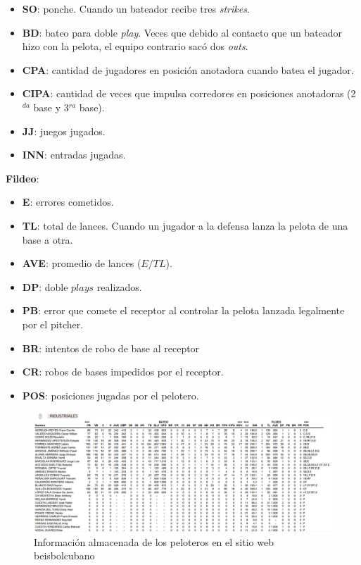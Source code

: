 \begin{itemize}
	\item \textbf{SO}: ponche. Cuando un bateador recibe tres \textit{strikes}.
	\item \textbf{BD}: bateo para doble \textit{play}. Veces que debido al contacto que un bateador hizo con la pelota, el equipo contrario sacó dos \textit{outs}.
	\item \textbf{CPA}: cantidad de jugadores en posición anotadora cuando batea el jugador.
	\item \textbf{CIPA}: cantidad de veces que impulsa corredores en posiciones anotadoras (2$^{da}$ base y 3$^{ra}$ base).
	\item \textbf{JJ}: juegos jugados.
	\item \textbf{INN}: entradas jugadas.
\end{itemize}
\large{\textbf{Fildeo}:}
\normalsize
\begin{itemize}
	\item \textbf{E}: errores cometidos.
	\item \textbf{TL}: total de lances. Cuando un jugador a la defensa lanza la pelota de una base a otra. 
	\item \textbf{AVE}: promedio de lances ($E/TL$).
	\item \textbf{DP}: doble $ plays $ realizados.
	\item \textbf{PB}: error que comete el receptor al controlar la pelota lanzada legalmente por el pitcher.
	\item \textbf{BR}: intentos de robo de base al receptor
	\item \textbf{CR}: robos de bases impedidos por el receptor.
	\item \textbf{POS}: posiciones jugadas por el pelotero.
\end{itemize}

\newpage
{}
\recalctypearea
\begin{figure} [H]
  \hspace{-2.7cm}  
	\includegraphics[width=1.3\textwidth]{figuras/informacionPelota.png}
	\caption{Información almacenada de los peloteros en el sitio web beisbolcubano}\label{info-pelota}
\end{figure}

